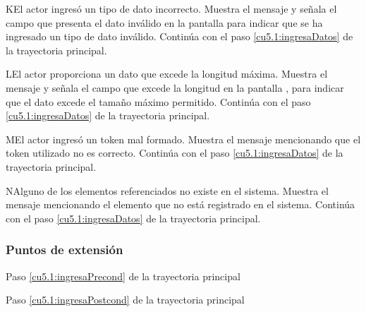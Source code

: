  \begin{UCtrayectoriaA}{K}{El actor ingresó un tipo de dato incorrecto.}
    \UCpaso[\UCsist] Muestra el mensaje  y señala el campo que presenta el dato inválido en la 
    pantalla  para indicar que se ha ingresado un tipo de dato inválido.
    \UCpaso[] Continúa con el paso \ref{cu5.1:ingresaDatos} de la trayectoria principal.
 \end{UCtrayectoriaA}
 \begin{UCtrayectoriaA}{L}{El actor proporciona un dato que excede la longitud máxima.}
    \UCpaso[\UCsist] Muestra el mensaje  y señala el campo que excede la 
    longitud en la pantalla , para indicar que el dato excede el tamaño máximo permitido.
    \UCpaso[] Continúa con el paso \ref{cu5.1:ingresaDatos} de la trayectoria principal.
 \end{UCtrayectoriaA}
 \begin{UCtrayectoriaA}{M}{El actor ingresó un token mal formado.}
    \UCpaso[\UCsist] Muestra el mensaje  mencionando que el token utilizado no es correcto.
    \UCpaso[] Continúa con el paso \ref{cu5.1:ingresaDatos} de la trayectoria principal.
 \end{UCtrayectoriaA}
 \begin{UCtrayectoriaA}{N}{Alguno de los elementos referenciados no existe en el sistema.}
    \UCpaso[\UCsist] Muestra el mensaje  mencionando el elemento que no está registrado en el sistema.
    \UCpaso[] Continúa con el paso \ref{cu5.1:ingresaDatos} de la trayectoria principal.
 \end{UCtrayectoriaA}
 

\subsubsection{Puntos de extensión}	
	{Paso \ref{cu5.1:ingresaPrecond} de la trayectoria principal}
	{}
	
	{Paso \ref{cu5.1:ingresaPostcond} de la trayectoria principal}
	{}